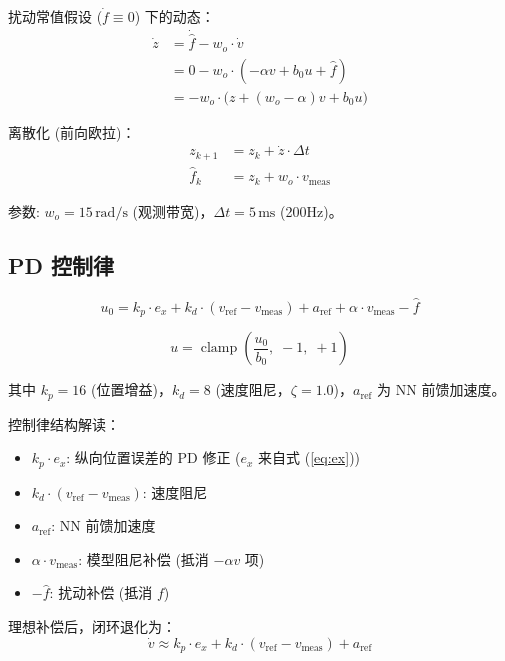 \documentclass[11pt,a4paper]{article}
\begin{document}
扰动常值假设 ($\dot{f} \equiv 0$) 下的动态：
\begin{align}
\dot{z} &= \dot{\hat{f}} - w_o \cdot \dot{v} \\
        &= 0 - w_o \cdot (-\alpha v + b_0 u + \hat{f}) \\
        &= -w_o \cdot \big(z + (w_o - \alpha)v + b_0 u\big)
\label{eq:zdot}
\end{align}

离散化 (前向欧拉)：
\begin{align}
z_{k+1} &= z_k + \dot{z} \cdot \Delta t \\
\hat{f}_{k} &= z_k + w_o \cdot v_{\text{meas}}
\end{align}

参数: $w_o = 15\,\text{rad/s}$ (观测带宽)，$\Delta t = 5\,\text{ms}$ (200Hz)。

\subsection{PD 控制律}

\begin{equation}
u_0 = k_p \cdot e_x + k_d \cdot (v_{\text{ref}} - v_{\text{meas}}) + a_{\text{ref}} + \alpha \cdot v_{\text{meas}} - \hat{f}
\label{eq:u0}
\end{equation}

\begin{equation}
u = \operatorname{clamp}\!\left(\frac{u_0}{b_0},\; -1,\; +1\right)
\label{eq:u}
\end{equation}

其中 $k_p = 16$ (位置增益)，$k_d = 8$ (速度阻尼，$\zeta = 1.0$)，$a_{\text{ref}}$ 为 NN 前馈加速度。

控制律结构解读：
\begin{itemize}
\item $k_p \cdot e_x$: 纵向位置误差的 PD 修正 ($e_x$ 来自式 (\ref{eq:ex}))
\item $k_d \cdot (v_{\text{ref}} - v_{\text{meas}})$: 速度阻尼
\item $a_{\text{ref}}$: NN 前馈加速度
\item $\alpha \cdot v_{\text{meas}}$: 模型阻尼补偿 (抵消 $-\alpha v$ 项)
\item $-\hat{f}$: 扰动补偿 (抵消 $f$)
\end{itemize}

理想补偿后，闭环退化为：
\begin{equation}
\dot{v} \approx k_p \cdot e_x + k_d \cdot (v_{\text{ref}} - v_{\text{meas}}) + a_{\text{ref}}
\end{equation}
\end{document}
